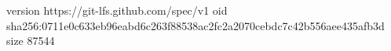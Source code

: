 version https://git-lfs.github.com/spec/v1
oid sha256:0711e0c633eb96eabd6c263f88538ac2fc2a2070cebdc7c42b556aee435afb3d
size 87544
